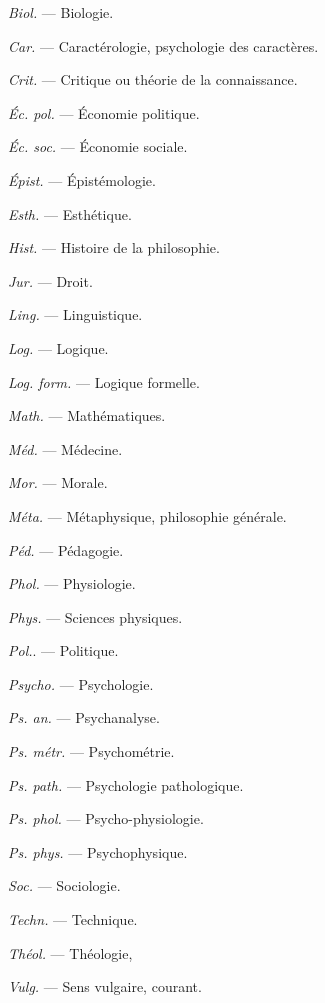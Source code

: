 \vspace{0.211cm}
\hfill
\begin{minipage}[c]{.45\linewidth}
\textsf{\textit {Biol.}} — Biologie.

\textsf{\textit {Car.}} — Caractérologie, psychologie
des caractères.

\textsf{\textit {Crit.}} — Critique ou théorie de la
connaissance.

\textsf{\textit {Éc. pol.}} — Économie politique.

\textsf{\textit {Éc. soc.}} — Économie sociale.

\textsf{\textit {Épist.}} — Épistémologie.

\textsf{\textit {Esth.}} — Esthétique.

\textsf{\textit {Hist.}} — Histoire de la philosophie.

\textsf{\textit {Jur.}} — Droit.

\textsf{\textit {Ling.}} — Linguistique.

\textsf{\textit {Log.}} — Logique.

\textsf{\textit {Log. form.}} — Logique formelle.

\textsf{\textit {Math.}} — Mathématiques.

\textsf{\textit {Méd.}} — Médecine.

\textsf{\textit {Mor.}} — Morale.
\end{minipage}
\hfill
\begin{minipage}[c]{.45\linewidth}
\textsf{\textit {Méta.}} — Métaphysique, philosophie
générale.

\textsf{\textit {Péd.}} — Pédagogie.

\textsf{\textit {Phol.}} — Physiologie.

\textsf{\textit {Phys.}} — Sciences physiques.

\textsf{\textit {Pol.}}. — Politique.

\textsf{\textit {Psycho.}} — Psychologie.

\textsf{\textit {Ps. an.}} — Psychanalyse.

\textsf{\textit {Ps. métr.}} — Psychométrie.

\textsf{\textit {Ps. path.}} — Psychologie pathologique.

\textsf{\textit {Ps. phol.}} — Psycho-physiologie.

\textsf{\textit {Ps. phys.}} — Psychophysique.

\textsf{\textit {Soc.}} — Sociologie.

\textsf{\textit {Techn.}} — Technique.

\textsf{\textit {Théol.}} — Théologie,

\textsf{\textit {Vulg.}} — Sens vulgaire, courant.
\end{minipage}

